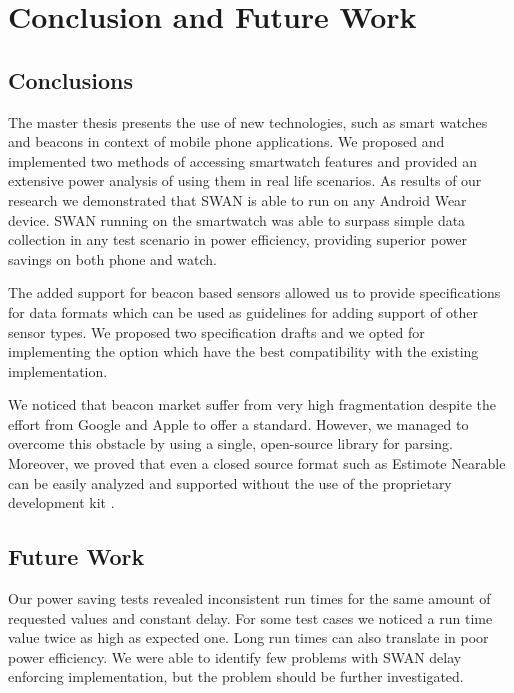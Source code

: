 
\chapter{Conclusion and Future Work} %

\label{Chapter7} %



\section{Conclusions}
The master thesis presents the use of new technologies, such as smart watches and beacons in context of mobile phone applications. We proposed and implemented two methods 
of accessing smartwatch features and provided an extensive power analysis of using them in real life scenarios. As results of our research we demonstrated that SWAN is able to run
on any Android Wear device. SWAN running on the smartwatch was able to surpass simple data collection in any test scenario in power efficiency,
providing superior power savings on both phone and watch.

The added support for beacon based sensors allowed us to provide specifications for data formats which can be used as guidelines for adding support of other sensor types. We proposed two
specification drafts and we opted for implementing the option which have the best compatibility with the existing implementation.

We noticed that beacon market suffer from very high fragmentation despite the effort from Google and Apple to offer a standard. However, we managed to overcome this obstacle by using
a single, open-source library for parsing. Moreover, we proved that even a closed source format such as Estimote Nearable can be easily analyzed and supported without the use of the proprietary development kit .

\section{Future Work}
Our power saving tests revealed inconsistent run times for the same amount of requested values and constant delay. For some test cases we noticed a run time value twice as high as expected one.
Long run times can also translate in poor power efficiency. We were able to identify few problems with SWAN delay enforcing implementation, but the problem should be further investigated.

